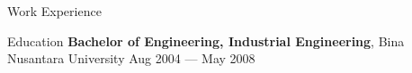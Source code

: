 \documentclass{resume} %
\begin{document}
\begin{rSection}{Work Experience}
\begin{rSection}{Education}
\textbf{Bachelor of Engineering, Industrial Engineering}, Bina Nusantara University \hfill {Aug 2004 --- May 2008}

\end{rSection}





\end{rSection}




\end{document}
